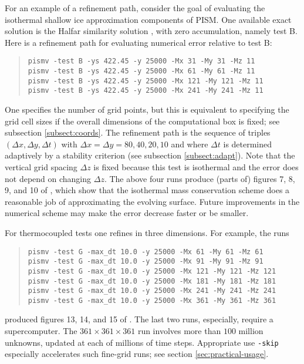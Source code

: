 For an example of a refinement path, consider the goal of evaluating the
isothermal shallow ice approximation components of PISM.  One available exact
solution is the Halfar similarity solution \cite{Halfar83}, with zero
accumulation, namely test B.  Here is a refinement path for evaluating
numerical error relative to test B:  
\begin{quote}\small
\begin{verbatim}
pismv -test B -ys 422.45 -y 25000 -Mx 31 -My 31 -Mz 11
pismv -test B -ys 422.45 -y 25000 -Mx 61 -My 61 -Mz 11
pismv -test B -ys 422.45 -y 25000 -Mx 121 -My 121 -Mz 11
pismv -test B -ys 422.45 -y 25000 -Mx 241 -My 241 -Mz 11
\end{verbatim}
\normalsize\end{quote}
One specifies the number of grid points, but this is equivalent to specifying the grid cell sizes if the overall dimensions of the computational box is fixed; see subsection \ref{subsect:coords}.  The refinement path is the sequence of triples $(\Delta x,\Delta y,\Delta t)$ with $\Delta x = \Delta y = 80,40,20,10$ and where $\Delta t$ is determined adaptively by a stability criterion (see subsection \ref{subsect:adapt}).  Note that the vertical grid spacing $\Delta z$ is fixed because this test is isothermal and the error does not depend on changing $\Delta z$.  The above four runs produce (parts of) figures 7, 8, 9, and 10 of \cite{BLKCB}, which show that the isothermal mass conservation scheme does a reasonable job of approximating the evolving surface.  Future improvements in the numerical scheme may make the error decrease faster or be smaller.

For thermocoupled tests one refines in three dimensions.  For example, the runs
\begin{quote}\small
\begin{verbatim}
pismv -test G -max_dt 10.0 -y 25000 -Mx 61 -My 61 -Mz 61
pismv -test G -max_dt 10.0 -y 25000 -Mx 91 -My 91 -Mz 91
pismv -test G -max_dt 10.0 -y 25000 -Mx 121 -My 121 -Mz 121
pismv -test G -max_dt 10.0 -y 25000 -Mx 181 -My 181 -Mz 181
pismv -test G -max_dt 10.0 -y 25000 -Mx 241 -My 241 -Mz 241
pismv -test G -max_dt 10.0 -y 25000 -Mx 361 -My 361 -Mz 361
\end{verbatim}
\normalsize\end{quote}
produced figures 13, 14, and 15 of \cite{BBL}.  The last two runs, especially, require a supercomputer.  The $361\times 361\times 361$ run involves more than $100$ million unknowns, updated at each of millions of time steps.  Appropriate use \texttt{-skip} especially accelerates such fine-grid runs; see section \ref{sec:practical-usage}.


